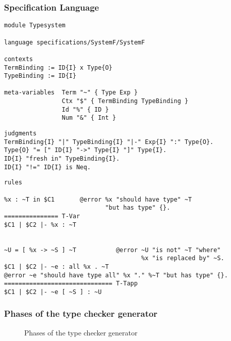 \documentclass{beamer}
\begin{document}
\begin{frame}
  \frametitle{Specification Language}
\begin{verbatim}
module Typesystem

language specifications/SystemF/SystemF

contexts
TermBinding := ID{I} x Type{O}
TypeBinding := ID{I}

meta-variables 	Term "~" { Type Exp }
                Ctx "$" { TermBinding TypeBinding }
                Id "%" { ID }
                Num "&" { Int }
\end{verbatim}
\framebreak{}
\begin{verbatim}
judgments
TermBinding{I} "|" TypeBinding{I} "|-" Exp{I} ":" Type{O}.
Type{O} "= [" ID{I} "->" Type{I} "]" Type{I}.
ID{I} "fresh in" TypeBinding{I}.
ID{I} "!=" ID{I} is Neq.
\end{verbatim}
\framebreak{}
\small
\begin{verbatim}
rules

%x : ~T in $C1       @error %x "should have type" ~T
                            "but has type" {}.
=============== T-Var
$C1 | $C2 |- %x : ~T


~U = [ %x -> ~S ] ~T           @error ~U "is not" ~T "where"
                                      %x "is replaced by" ~S.
$C1 | $C2 |- ~e : all %x . ~T
@error ~e "should have type all" %x "." %~T "but has type" {}.
============================== T-Tapp
$C1 | $C2 |- ~e [ ~S ] : ~U
\end{verbatim}
\end{frame}

\newcommand*\selectTemplateGeneration{}
\newcommand*\selectTemplateOptimization{}
\newcommand*\selectConstraintGeneration{}
\newcommand*\selectConstraintSolving{}
\begin{frame}[fragile, label=overview]
  \frametitle{Phases of the type checker generator}
\begin{figure}
\caption{Phases of the type checker generator}
\label{fig:phases}
\end{figure}
\end{frame}
\end{document}
